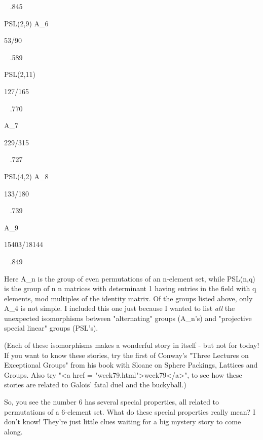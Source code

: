             
 ~ .845

PSL(2,9) \cong  A_{6}      
                           
             
53/90
                            
~ .589

PSL(2,11)      
                     
                                
 127/165
                                
      ~ .770

A_{7} 
                          
               
               
                           229/315   
                    
    ~ .727 

PSL(4,2) \cong  A_{8}          
                          
   
                   133/180   
                          
      
  ~ .739

A_{9}
               
        
        
        
        
     
                15403/18144 
                        
~ .849

Here A_{n} is the group of even permutations of an n-element set,
while PSL(n,q) is the group of n \times  n matrices with determinant 1
having entries in the field with q elements, mod multiples of the identity
matrix.  Of the groups listed above, only A_{4} is not simple.  I
included this one just because I wanted to list \emph{all} the unexpected
isomorphisms between "alternating" groups (A_{n}'s) and "projective
special linear" groups (PSL's).

(Each of these isomorphisms makes a wonderful story in 
itself - but not for today!  If you want to know these stories, 
try the first of Conway's "Three Lectures on Exceptional Groups" from his 
book with Sloane on Sphere Packings, Lattices and Groups.  Also try 
"<a href = "week79.html">week79</a>", to see how these stories
are related to Galois' fatal duel and the buckyball.) 

So, you see the number 6 has several special properties, all related to
permutations of a 6-element set.  What do these special properties
really mean?  I don't know!  They're just little clues waiting for a
big mystery story to come along.

